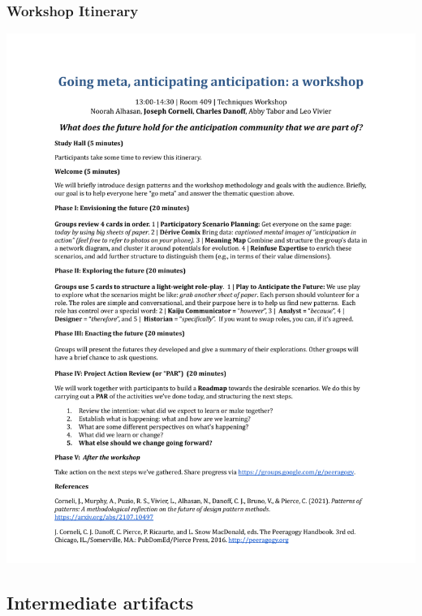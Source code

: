 \documentclass[acmlarge,timestamp]{acmart}
\begin{document}
\clearpage

\subsubsection{Workshop Itinerary}\label{first-workshop-itinerary}

\begin{mdframed}[backgroundcolor=blue!50,linecolor=blue!50]
  \noindent\includegraphics[width=\textwidth,trim={1cm 4.5cm 1cm 4.5cm},clip=true]{anticipation}
\end{mdframed}

\clearpage

\subsection{Intermediate artifacts}
\end{document}
